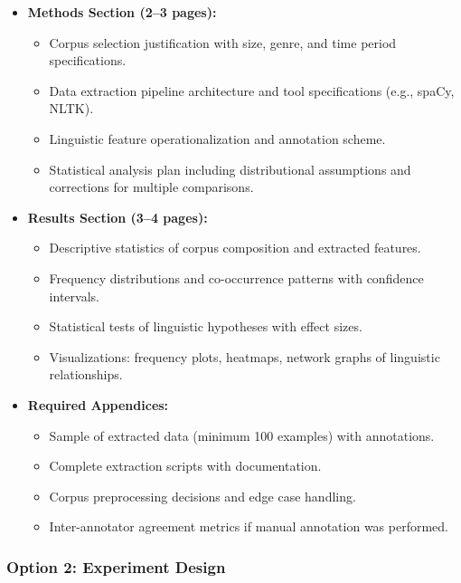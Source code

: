 \documentclass[10pt,letterpaper]{article}
\begin{document}
\begin{graybox}
\begin{itemize}
  \item \textbf{Methods Section (2--3 pages):}
    \begin{itemize}
      \item Corpus selection justification with size, genre, and time period specifications.
      \item Data extraction pipeline architecture and tool specifications (e.g., spaCy, NLTK).
      \item Linguistic feature operationalization and annotation scheme.
      \item Statistical analysis plan including distributional assumptions and corrections for multiple comparisons.
    \end{itemize}
  \item \textbf{Results Section (3--4 pages):}
    \begin{itemize}
      \item Descriptive statistics of corpus composition and extracted features.
      \item Frequency distributions and co-occurrence patterns with confidence intervals.
      \item Statistical tests of linguistic hypotheses with effect sizes.
      \item Visualizations: frequency plots, heatmaps, network graphs of linguistic relationships.
    \end{itemize}
  \item \textbf{Required Appendices:}
    \begin{itemize}
      \item Sample of extracted data (minimum 100 examples) with annotations.
      \item Complete extraction scripts with documentation.
      \item Corpus preprocessing decisions and edge case handling.
      \item Inter-annotator agreement metrics if manual annotation was performed.
    \end{itemize}
\end{itemize}
\end{graybox}

\subsubsection{Option 2: Experiment Design}
\end{document}
